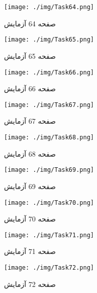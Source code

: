 {    %
    \begin{figure}[htpb]
        \centering
        \texttt{[image: ./img/Task64.png]}
        \caption{ صفحه 64 آزمایش }
        \label{fig:Task64}
    \end{figure}


    \begin{figure}[htpb]
        \centering
        \texttt{[image: ./img/Task65.png]}
        \caption{ صفحه 65 آزمایش }
        \label{fig:Task65}
    \end{figure}


    \begin{figure}[htpb]
        \centering
        \texttt{[image: ./img/Task66.png]}
        \caption{ صفحه 66 آزمایش }
        \label{fig:Task66}
    \end{figure}


    \begin{figure}[htpb]
        \centering
        \texttt{[image: ./img/Task67.png]}
        \caption{ صفحه 67 آزمایش }
        \label{fig:Task67}
    \end{figure}


    \begin{figure}[htpb]
        \centering
        \texttt{[image: ./img/Task68.png]}
        \caption{ صفحه 68 آزمایش }
        \label{fig:Task68}
    \end{figure}


    \begin{figure}[htpb]
        \centering
        \texttt{[image: ./img/Task69.png]}
        \caption{ صفحه 69 آزمایش }
        \label{fig:Task69}
    \end{figure}


    \begin{figure}[htpb]
        \centering
        \texttt{[image: ./img/Task70.png]}
        \caption{ صفحه 70 آزمایش }
        \label{fig:Task70}
    \end{figure}


    \begin{figure}[htpb]
        \centering
        \texttt{[image: ./img/Task71.png]}
        \caption{ صفحه 71 آزمایش }
        \label{fig:Task71}
    \end{figure}


    \begin{figure}[htpb]
        \centering
        \texttt{[image: ./img/Task72.png]}
        \caption{ صفحه 72 آزمایش }
        \label{fig:Task72}
    \end{figure}


}
